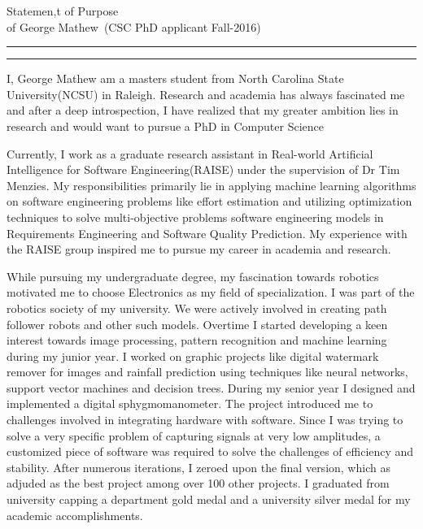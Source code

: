 \documentclass{article}
\newcommand{\soptitle}{Statemen,t of Purpose}
\newcommand{\yourname}{George Mathew}
\begin{document}
\begin{center}\LARGE\soptitle\\
\large of \yourname\ (CSC PhD applicant Fall-2016)
\end{center}

\hrule
\vspace{1pt}
\hrule height 1pt

\bigskip

I, George Mathew am a masters student from North Carolina State University(NCSU) in Raleigh. Research and academia has always fascinated me and after a deep introspection, I have realized that my greater ambition lies in research and would want to pursue a PhD in Computer Science

\bigskip
Currently, I work as a graduate research assistant in Real-world Artificial Intelligence for 
Software Engineering(RAISE) under the supervision of Dr Tim Menzies.
 My responsibilities primarily lie in applying machine learning algorithms on software engineering 
 problems like effort estimation and utilizing optimization techniques to solve multi-objective problems software engineering models in Requirements Engineering and Software Quality Prediction. My experience with the RAISE group inspired me to pursue my career in academia and research. 

\bigskip

While pursuing my undergraduate degree, my fascination towards robotics motivated me to choose Electronics as my field of specialization. I was part of the robotics society of my university. We were actively involved in creating path follower robots and other such models. Overtime I started developing a keen interest towards image 
processing, pattern recognition and machine learning during my junior year. I worked on 
graphic projects like digital watermark remover for images and rainfall prediction using techniques like neural 
networks, support vector machines and decision trees. During my senior year I designed and implemented a digital sphygmomanometer. The project introduced me to challenges involved in integrating hardware with software. Since I was trying to solve a very specific problem of capturing signals at very low amplitudes, a customized piece of software was required to solve the challenges of efficiency and stability. After numerous iterations, I zeroed upon the final version, which as adjuded as the best project among over 100 other projects. I graduated from university capping a department gold 
medal and a university silver medal for my academic accomplishments.
\end{document}
